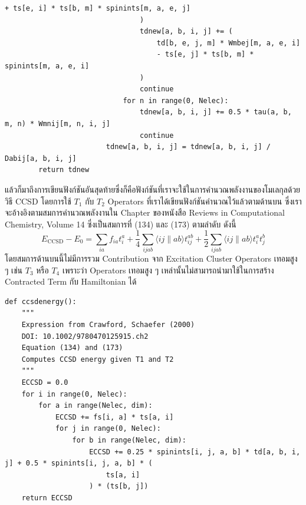 \begin{lstlisting}[style=MyPython]
                                    + ts[e, i] * ts[b, m] * spinints[m, a, e, j]
                                )
                                tdnew[a, b, i, j] += (
                                    td[b, e, j, m] * Wmbej[m, a, e, i]
                                    - ts[e, j] * ts[b, m] * spinints[m, a, e, i]
                                )
                                continue
                            for n in range(0, Nelec):
                                tdnew[a, b, i, j] += 0.5 * tau(a, b, m, n) * Wmnij[m, n, i, j]
                                continue
                        tdnew[a, b, i, j] = tdnew[a, b, i, j] / Dabij[a, b, i, j]
        return tdnew
\end{lstlisting}

\vspace{5pt}

แล้วก็มาถึงการเขียนฟังก์ชันอันสุดท้ายซึ่งก็คือฟังก์ชันที่เราจะใช้ในการคำนวณพลังงานของโมเลกุลด้วยวิธี CCSD โดยการใช้ $T_{1}$ กับ $T_{2}$ Operators ที่เราได้เขียนฟังก์ชันคำนวณไว้แล้วตามด้านบน ซึ่งเราจะอ้างอิงตามสมการคำนวณพลังงานใน Chapter ของหนังสือ Reviews in Computational Chemistry, Volume 14\autocite{crawford2000} ซึ่งเป็นสมการที่ (134) และ (173) ตามลำดับ ดังนี้
%
\begin{equation}
  E_{\mathrm{CCSD}}-E_0
  =
  \sum_{i a}
  f_{i a} t_i^a
  + \frac{1}{4} \sum_{i j a b}\langle i j \| a b\rangle t_{i j}^{a b}
  + \frac{1}{2} \sum_{i j a b}\langle i j \| a b\rangle t_i^a t_j^b
\end{equation}
%
โดยสมการด้านบนนี้ไม่มีการรวม Contribution จาก Excitation Cluster Operators เทอมสูง ๆ เช่น $T_{3}$ หรือ $T_{4}$ เพราะว่า Operators เทอมสูง ๆ เหล่านั้นไม่สามารถนำมาใช้ในการสร้าง Contracted Term กับ Hamiltonian ได้

\vspace{5pt}

\begin{lstlisting}[style=MyPython]
def ccsdenergy():
    """
    Expression from Crawford, Schaefer (2000)
    DOI: 10.1002/9780470125915.ch2
    Equation (134) and (173)
    Computes CCSD energy given T1 and T2
    """
    ECCSD = 0.0
    for i in range(0, Nelec):
        for a in range(Nelec, dim):
            ECCSD += fs[i, a] * ts[a, i]
            for j in range(0, Nelec):
                for b in range(Nelec, dim):
                    ECCSD += 0.25 * spinints[i, j, a, b] * td[a, b, i, j] + 0.5 * spinints[i, j, a, b] * (
                        ts[a, i]
                    ) * (ts[b, j])
    return ECCSD
\end{lstlisting}


